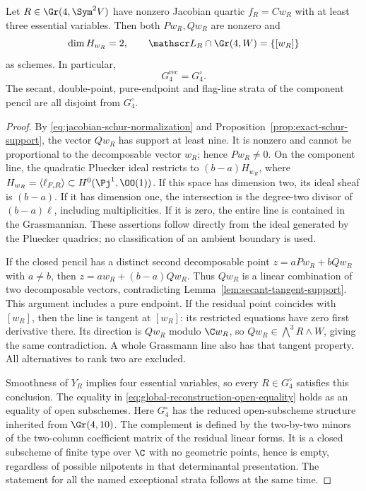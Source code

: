 \begin{theorem}
\label{thm:global-schur-recombination}
Let \(R\in\Gr(4,\Sym^2V)\) have nonzero Jacobian quartic
\(f_R=Cw_R\) with at least three essential variables.  Then
both \(Pw_R,Qw_R\) are nonzero and
\[
 \dim H_{w_R}=2,\qquad
 \mathscr L_R\cap\Gr(4,W)=\{[w_R]\}
\]
as schemes.  In particular,
\begin{equation}\label{eq:global-reconstruction-open-equality}
                  G_4^{\mathrm{rec}}=G_4^\circ.
\end{equation}
The secant, double-point, pure-endpoint and flag-line strata of the
component pencil are all disjoint from \(G_4^\circ\).
\end{theorem}
\begin{proof}
By \eqref{eq:jacobian-schur-normalization} and
Proposition~\ref{prop:exact-schur-support}, the vector \(Qw_R\)
has support at least nine.  It is nonzero and cannot be proportional
to the decomposable vector \(w_R\); hence \(Pw_R\ne0\).
On the component line, the quadratic Pluecker ideal restricts to
\((b-a)H_{w_R}\), where
\(H_{w_R}=\langle\ell_{F,R}\rangle\subset H^0(\Pj^1,\OO(1))\).
If this space has dimension two, its ideal sheaf is \((b-a)\).
If it has dimension one, the intersection is the degree-two divisor
of \((b-a)\ell\), including multiplicities.  If it is zero,
the entire line is contained in the Grassmannian.  These assertions
follow directly from the ideal generated by the Pluecker quadrics;
no classification of an ambient boundary is used.

If the closed pencil has a distinct second decomposable point
\(z=aPw_R+bQw_R\) with \(a\ne b\), then
\(z=a w_R+(b-a)Qw_R\).  Thus \(Qw_R\) is a linear
combination of two decomposable vectors, contradicting
Lemma~\ref{lem:secant-tangent-support}.  This argument includes a
pure endpoint.  If the residual point coincides with \([w_R]\),
then the line is tangent at \([w_R]\): its restricted equations
have zero first derivative there.  Its direction is \(Qw_R\)
modulo \(\C w_R\), so \(Qw_R\in\bigwedge^3R\wedge W\),
giving the same contradiction.  A whole Grassmann line also has that tangent
property.  All alternatives to rank two are excluded.

Smoothness of \(Y_R\) implies four essential variables, so every
\(R\in G_4^\circ\) satisfies this conclusion.  The equality
in \eqref{eq:global-reconstruction-open-equality} holds as an
equality of open subschemes.  Here \(G_4^\circ\) has the
reduced open-subscheme structure inherited from \(\Gr(4,10)\).
The complement is defined by the two-by-two minors of the
two-column coefficient matrix of the residual linear forms.
It is a closed subscheme of finite type over \(\C\) with no
geometric points, hence is empty, regardless of possible nilpotents
in that determinantal presentation.  The statement for all the named
exceptional strata follows at the same time.
\end{proof}

